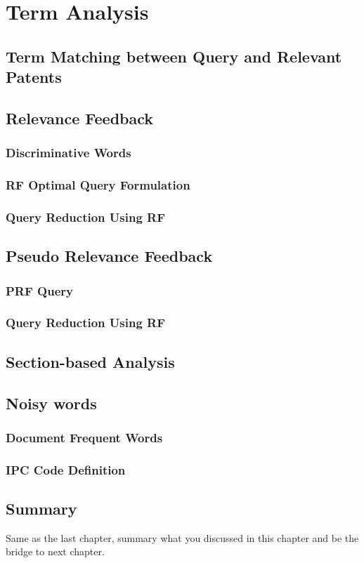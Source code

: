 \chapter{Term Analysis}
\label{cha:analysis}

\section{Term Matching between Query and Relevant Patents}
\label{sec:termmismatch}

\section{Relevance Feedback}

\subsection{Discriminative Words}
\label{sec:discriminative}

\subsection{RF Optimal Query Formulation}
\label{sec:formulation}

\subsection{Query Reduction Using RF}

\section{Pseudo Relevance Feedback}

\subsection{PRF Query}
\subsection{Query Reduction Using RF}

\section{Section-based Analysis}

\section{Noisy words}

\subsection{Document Frequent Words}

\subsection{IPC Code Definition}

\section{Summary}
Same as the last chapter, summary what you discussed in this chapter and
be the bridge to next chapter.
